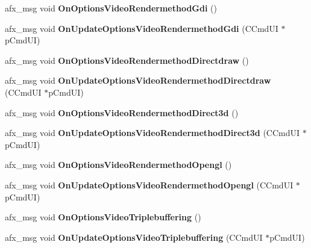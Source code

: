 \begin{DoxyCompactItemize}
afx\+\_\+msg void {\bfseries On\+Options\+Video\+Rendermethod\+Gdi} ()
\item 
\mbox{\label{class_main_wnd_aa9bcdd260d4a368a3ae7b3b988b5adb6}} 
afx\+\_\+msg void {\bfseries On\+Update\+Options\+Video\+Rendermethod\+Gdi} (C\+Cmd\+UI $\ast$p\+Cmd\+UI)
\item 
\mbox{\label{class_main_wnd_a09d758ad2d47abea0fbed2f778501958}} 
afx\+\_\+msg void {\bfseries On\+Options\+Video\+Rendermethod\+Directdraw} ()
\item 
\mbox{\label{class_main_wnd_aeb37587c171ba07587e8ae76b18afa61}} 
afx\+\_\+msg void {\bfseries On\+Update\+Options\+Video\+Rendermethod\+Directdraw} (C\+Cmd\+UI $\ast$p\+Cmd\+UI)
\item 
\mbox{\label{class_main_wnd_aa90dfd9dfe90390a030a60e484af0958}} 
afx\+\_\+msg void {\bfseries On\+Options\+Video\+Rendermethod\+Direct3d} ()
\item 
\mbox{\label{class_main_wnd_a8779ba5e97c383930dcaa658e6f26438}} 
afx\+\_\+msg void {\bfseries On\+Update\+Options\+Video\+Rendermethod\+Direct3d} (C\+Cmd\+UI $\ast$p\+Cmd\+UI)
\item 
\mbox{\label{class_main_wnd_ad8709590f7d9289c19ec3a216490d742}} 
afx\+\_\+msg void {\bfseries On\+Options\+Video\+Rendermethod\+Opengl} ()
\item 
\mbox{\label{class_main_wnd_a7871df88f8403990a518d441b242a633}} 
afx\+\_\+msg void {\bfseries On\+Update\+Options\+Video\+Rendermethod\+Opengl} (C\+Cmd\+UI $\ast$p\+Cmd\+UI)
\item 
\mbox{\label{class_main_wnd_a3d08e3bf2be9dee73c57674e4a6d890e}} 
afx\+\_\+msg void {\bfseries On\+Options\+Video\+Triplebuffering} ()
\item 
\mbox{\label{class_main_wnd_afe2f2080e99e36884b1cc80dcc996520}} 
afx\+\_\+msg void {\bfseries On\+Update\+Options\+Video\+Triplebuffering} (C\+Cmd\+UI $\ast$p\+Cmd\+UI)
\item 
\mbox{\label{class_main_wnd_a69c7fd2297cf789a4d25ffd6099776e6}} 

\end{DoxyCompactItemize}
